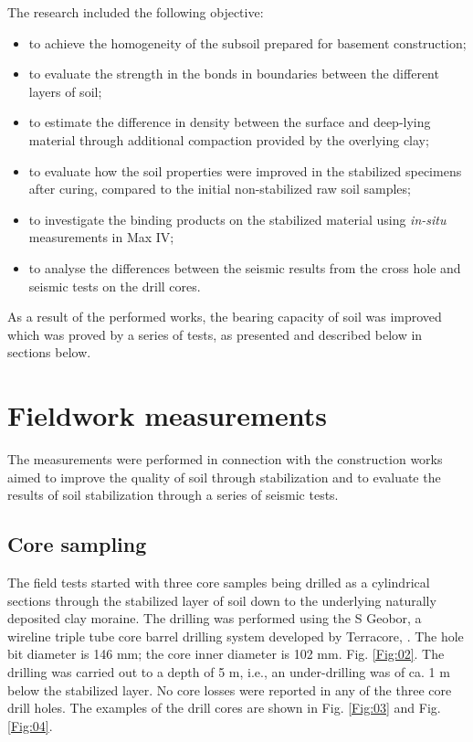 \documentclass[USenglish,twocolumn]{article}
\begin{document}
The research included the following objective: 

\begin{itemize}
	\item to achieve the homogeneity of the subsoil prepared for basement construction;
	\item to evaluate the strength in the bonds in boundaries between the different layers of soil;
	\item to estimate the difference in density between the surface and deep-lying material through additional compaction provided by the overlying clay;
	\item to evaluate how the soil properties were improved in the stabilized specimens after curing, compared to the initial non-stabilized raw soil samples;
	\item to investigate the binding products on the stabilized material using \emph{in-situ} measurements in Max IV;
	\item to analyse the differences between the seismic results from the cross hole and seismic tests on the drill cores.
\end{itemize}

As a result of the performed works, the bearing capacity of soil was improved which was proved by a series of tests, as presented and described below in sections below.

\section{Fieldwork measurements}\label{sec:3}
The measurements were performed in connection with the construction works aimed to improve the quality of soil through stabilization and to evaluate the results of soil stabilization through a series of seismic tests. 

\subsection{Core sampling}

The field tests started with three core samples being drilled as a cylindrical sections through the stabilized layer of soil down to the underlying naturally deposited clay moraine. The drilling was performed using the S Geobor, a wireline triple tube core barrel drilling system developed by Terracore, \cite{Epiroc}. The hole bit diameter is 146 mm; the core inner diameter is 102 mm. Fig. \ref{Fig:02}. The drilling was carried out to a depth of 5 m, i.e., an under-drilling was of ca. 1 m below the stabilized layer. No core losses were reported in any of the three core drill holes. The examples of the drill cores are shown in Fig. \ref{Fig:03} and Fig. \ref{Fig:04}.
\end{document}

